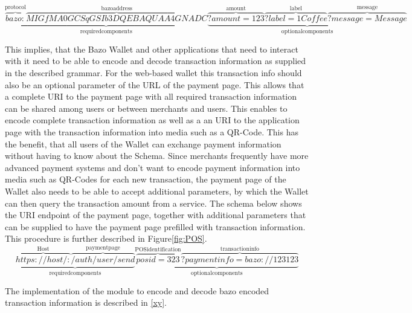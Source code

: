 \documentclass[a4paper]{article}
\begin{document}
\[
\underbrace{\overbrace{bazo:}^{\mathrm{protocol}}\overbrace{MIGfMA0GCSqGSIb3DQEBAQUAA4GNADC}^{\mathrm{bazo address}}}_{\mathrm{required components}}
\underbrace{\overbrace{?amount=123}^{\mathrm{amoun t}}\overbrace{?label=1 Coffee}^{\mathrm{label}}\overbrace{?message=Message}^{\mathrm{message}}}_{\mathrm{optional components}}
\]


This implies, that the Bazo Wallet and other applications that need to interact with it need to be able to encode and decode transaction information as supplied in the described grammar.
For the web-based wallet this transaction info should also be an optional parameter of the URL of the payment page. This allows that a complete URI to the payment page with all required transaction information can be shared among users or between merchants and users.
This enables to encode complete transaction information as well as a an URI to the application page with the transaction information into media such as a QR-Code. This has the benefit, that all users of the Wallet can exchange payment information without having to know about the Schema.
Since merchants frequently have more advanced payment systems and don't want to encode payment information into media such as QR-Codes for each new transaction, the payment page of the Wallet also needs to be able to accept additional parameters, by which the Wallet can then query the transaction amount from a service.
The schema below shows the URI endpoint of the payment page, together with additional parameters that can be supplied to have the payment page prefilled with transaction information. This procedure is further described in Figure\ref{fig:POS}.
\[
\underbrace{\overbrace{https://host/:}^{\mathrm{Host}}\overbrace{/auth/user/send}^{\mathrm{payment page}}}_{\mathrm{required components}}
\underbrace{\overbrace{posid=323}^{\mathrm{POS identification}}\overbrace{?paymentinfo=bazo://123123}^{\mathrm{transaction info}}}_{\mathrm{optional components}}
\]

The implementation of the module to encode and decode bazo encoded transaction information is described in \ref{xy}.
\end{document}
